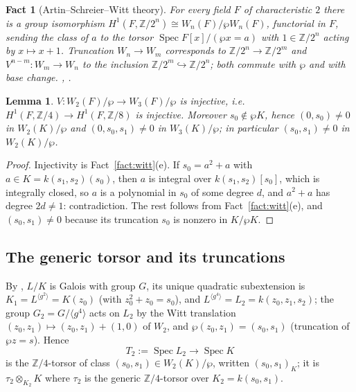 \documentclass[11pt]{amsart}
\newtheorem{lemma}[theorem]{Lemma}
\newtheorem{fact}[theorem]{Fact}
\theoremstyle{definition}
\theoremstyle{remark}
\newcommand{\Z}{\mathbb Z}
\newcommand{\Spec}{\operatorname{Spec}}
\begin{document}
\begin{fact}[Artin--Schreier--Witt theory]\label{fact:asw}
For every field $F$ of characteristic $2$ there is a group isomorphism
$H^1(F,\Z/2^n)\cong W_n(F)/\wp W_n(F)$, functorial in $F$, sending the class of $a$ to
the torsor $\Spec F[x]/(\wp x=a)$ with $1\in\Z/2^n$ acting by $x\mapsto x+1$.
Truncation $W_n\to W_m$ corresponds to $\Z/2^n\to\Z/2^m$ and $V^{n-m}\colon W_m\to W_n$
to the inclusion $\Z/2^m\hookrightarrow\Z/2^n$; both commute with $\wp$ and with base
change. \cite[\S2.2]{P}, \cite[Ch.~V]{Se}.
\end{fact}

\begin{lemma}\label{lem:Vinj}
$V\colon W_2(F)/\wp\to W_3(F)/\wp$ is injective, i.e.\ $H^1(F,\Z/4)\to H^1(F,\Z/8)$ is
injective. Moreover $s_0\notin\wp K$, hence $(0,s_0)\ne0$ in $W_2(K)/\wp$ and
$(0,s_0,s_1)\ne0$ in $W_3(K)/\wp$; in particular $(s_0,s_1)\ne0$ in $W_2(K)/\wp$.
\end{lemma}

\begin{proof}
Injectivity is Fact~\ref{fact:witt}(e). If $s_0=a^2+a$ with $a\in K=k(s_1,s_2)(s_0)$,
then $a$ is integral over $k(s_1,s_2)[s_0]$, which is integrally closed, so $a$ is a
polynomial in $s_0$ of some degree $d$, and $a^2+a$ has degree $2d\ne1$: contradiction.
The rest follows from Fact~\ref{fact:witt}(e), and $(s_0,s_1)\ne0$ because its
truncation $s_0$ is nonzero in $K/\wp K$.
\end{proof}

\subsection{The generic torsor and its truncations}
By \cite[\S2.3, Proposition 3.9]{P}, $L/K$ is Galois with group $G$, its unique
quadratic subextension is $K_1=L^{\langle g^2\rangle}=K(z_0)$ (with $z_0^2+z_0=s_0$), and
$L^{\langle g^4\rangle}=L_2=k(z_0,z_1,s_2)$; the group $G_2=G/\langle g^4\rangle$ acts on $L_2$
by the Witt translation $(z_0,z_1)\mapsto(z_0,z_1)+(1,0)$ of $W_2$, and
$\wp(z_0,z_1)=(s_0,s_1)$ (truncation of $\wp z=s$). Hence
\[
T_2:=\Spec L_2\longrightarrow\Spec K
\]
is the $\Z/4$-torsor of class $(s_0,s_1)\in W_2(K)/\wp$, written $(s_0,s_1)_K$; it is
$\tau_2\otimes_{K_2}K$ where $\tau_2$ is the generic $\Z/4$-torsor over $K_2=k(s_0,s_1)$.
\end{document}
